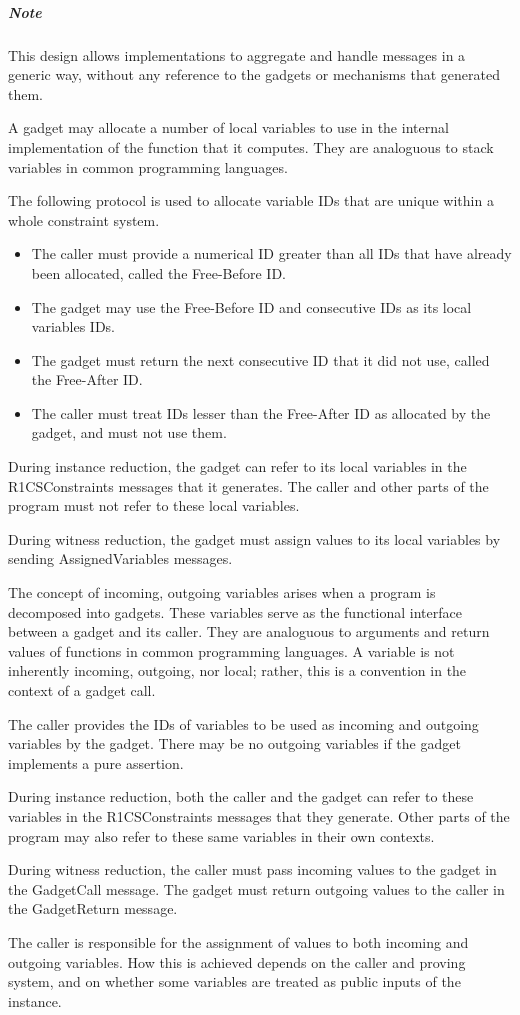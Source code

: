 	\subparagraph{Note}
	This design allows implementations to aggregate and handle messages in a generic way,
	without any	reference to the gadgets or mechanisms that generated them.

	A gadget may allocate a number of local variables to use
	in the internal implementation of the function that it computes.
	They are analoguous to stack variables in common programming languages.

	The following protocol is used to allocate variable IDs that are
	unique within a whole constraint system.
	\begin{itemize}
		\item The caller must provide a numerical ID greater than all IDs that have already been allocated, called the Free-Before ID.
		\item The gadget may use the Free-Before ID and consecutive IDs as its local variables IDs.
		\item The gadget must return the next consecutive ID that it did not use, called the Free-After ID.
		\item The caller must treat IDs lesser than the Free-After ID as allocated by the gadget,
			and must not use them.
	\end{itemize}

	During instance reduction, the gadget can refer to
	its local variables in the R1CSConstraints messages that it generates.
	The caller and other parts of the program must not refer to these local variables.

	During witness reduction, the gadget must assign values to its local variables
	by sending AssignedVariables messages.


	The concept of incoming, outgoing variables arises when a program is decomposed into gadgets.
	These variables serve as the functional interface between a gadget and its caller.
	They are analoguous to arguments and return values of functions in common programming languages.
	A variable is not inherently incoming, outgoing, nor local;
	rather, this is a convention in the context of a gadget call.

	The caller provides the IDs of variables to be used as incoming and outgoing variables by the gadget.
	There may be no outgoing variables if the gadget implements a pure assertion.

	During instance reduction, both the caller and the gadget can refer to
	these variables in the R1CSConstraints messages that they generate.
	Other parts of the program may also refer to these same variables in their own contexts.

	During witness reduction, the caller must pass incoming values to the gadget in the GadgetCall message.
	The gadget must return outgoing values to the caller in the GadgetReturn message.

	The caller is responsible for the assignment of values to both incoming and outgoing variables.
	How this is achieved depends on the caller and proving system,
	and on whether some variables are treated as public inputs of the instance.
